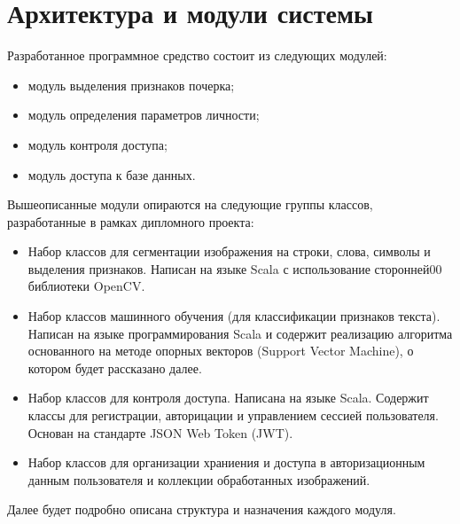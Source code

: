 \section{Архитектура и модули системы}

Разработанное программное средство состоит из следующих модулей:
\begin{itemize}
    \item модуль выделения признаков почерка;
    \item модуль определения параметров личности;
    \item модуль контроля доступа;
    \item модуль доступа к базе данных.
\end{itemize}

Вышеописанные модули опираются на следующие группы классов, разработанные в рамках дипломного проекта:
\begin{itemize}
    \item Набор классов для сегментации изображения на строки, слова, символы и выделения признаков. Написан на языке Scala с использование сторонней00 библиотеки OpenCV.
    \item Набор классов машинного обучения (для классификации признаков текста). Написан на языке программирования Scala и содержит реализацию алгоритма основанного на методе опорных векторов (Support Vector Machine), о котором будет рассказано далее.
    \item Набор классов для контроля доступа. Написана на языке Scala. Содержит классы для регистрации, авторицации и управлением сессией пользователя. Основан на стандарте JSON Web Token (JWT).
    \item Набор классов для организации храниения и доступа в авторизационным данным пользователя и коллекции обработанных изображений.
\end{itemize}

Далее будет подробно описана структура и назначения каждого модуля.


